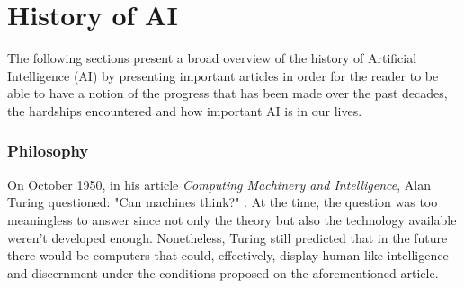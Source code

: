 \documentclass[class=report, crop=false, a4paper, 12pt]{standalone}
\begin{document}
\section{History of AI}
The following sections present a broad overview of the history of Artificial Intelligence (AI) by presenting important articles in order for the reader to be able to have a notion of the progress that has been made over the past decades, the hardships encountered and how important AI is in our lives. 

\subsubsection{Philosophy}
On October 1950, in his article \textit{Computing Machinery and Intelligence}, Alan Turing questioned: "Can machines think?" \autocite{turingCOMPUTINGMACHINERYINTELLIGENCE1950}. At the time, the question was too meaningless to answer since not only the theory but also the technology available weren't developed enough. Nonetheless, Turing still predicted that in the future there would be computers that could, effectively, display human-like intelligence and discernment under the conditions proposed on the aforementioned article.

\end{document}
